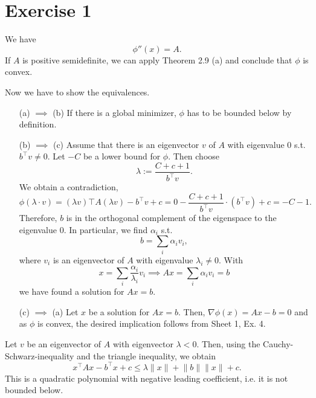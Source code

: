 \documentclass{article}
\begin{document}
\section*{Exercise 1}
    We have
    \[
        \phi''(x) = A.
    \]
    If \(A\) is positive semidefinite, we can apply Theorem 2.9 (a) and conclude that \(\phi\) is convex.

    Now we have to show the equivalences. 
    \begin{itemize}
        \item[(a) $\implies$ (b)] If there is a global minimizer, $\phi$ has to be bounded below by definition.
        \item[(b) $\implies$ (c)] Assume that there is an eigenvector $v$ of $A$ with eigenvalue $0$ s.t. $b^\top v \neq 0$.
        Let $-C$ be a lower bound for $\phi$. Then choose 
        \[
            \lambda := \frac{C + c + 1}{b^\top v}.
        \]
        We obtain a contradiction,
        \[
            \phi(\lambda \cdot v) = (\lambda v)\top A (\lambda v) - b^\top v + c = 0 - \frac{C + c + 1}{b^\top v} \cdot (b^\top v) + c = - C - 1.
        \]
        Therefore, $b$ is in the orthogonal complement of the eigenspace to the eigenvalue 0. In particular, we find $\alpha_i$ s.t.
        \[
            b = \sum_i \alpha_i v_i,  
        \]
        where $v_i$ is an eigenvector of $A$ with eigenvalue $\lambda_i \neq 0$.
        With
        \[
            x = \sum_i \frac{\alpha_i}{\lambda_i} v_i \implies Ax = \sum_i \alpha_i v_i = b
        \]
        we have found a solution for $Ax = b$.
        \item[(c) $\implies$ (a)] Let $x$ be a solution for $Ax = b$. Then, $\nabla \phi(x) = Ax - b = 0$ and as $\phi$ is convex, the desired implication follows from Sheet 1, Ex. 4.
    \end{itemize}
    Let $v$ be an eigenvector of $A$ with eigenvector $\lambda < 0$. Then, using the Cauchy-Schwarz-inequality and the triangle inequality, we obtain
    \[
        x^\top A x - b^\top x + c \leq \lambda \lVert x\rVert + \lVert b\rVert\lVert x\rVert + c.
    \]
    This is a quadratic polynomial with negative leading coefficient, i.e. it is not bounded below.
\end{document}
